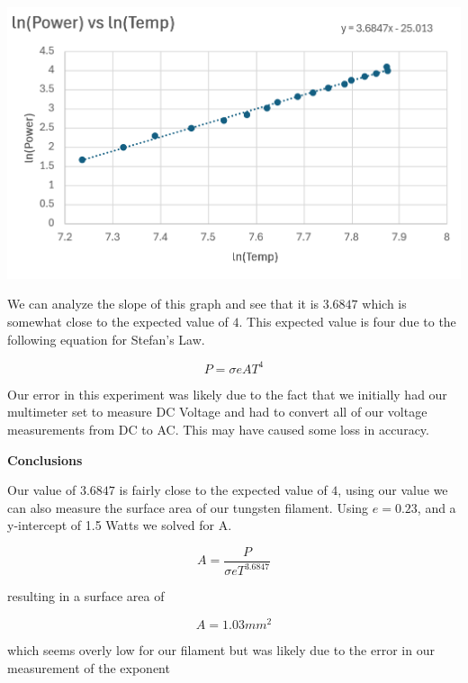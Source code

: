 \documentclass[12pt]{article}
\begin{document}
\begin{center}
    \includegraphics[scale=0.5]{graph_14.png}
\end{center}

We can analyze the slope of this graph and see that it is $3.6847$ which is somewhat close to the expected
value of $4$. This expected value is four due to the following equation for Stefan's Law.

\[ P = \sigma eAT^{4} \]

Our error in this experiment was likely due to the fact that we initially had our multimeter
set to measure DC Voltage and had to convert all of our voltage measurements from DC to AC. This
may have caused some loss in accuracy.

\newpage

\textbf{Conclusions}\vspace{1em}

Our value of $3.6847$ is fairly close to the expected value of $4$, using our value we can also measure the
surface area of our tungsten filament. Using $e = 0.23$, and a y-intercept of 1.5 Watts we solved for A.

\[ A = \frac{P}{\sigma eT^{3.6847}} \]

resulting in a surface area of

\[ A = 1.03 mm^{2} \]

which seems overly low for our filament but was likely due to the error in our measurement of the exponent
\end{document}

